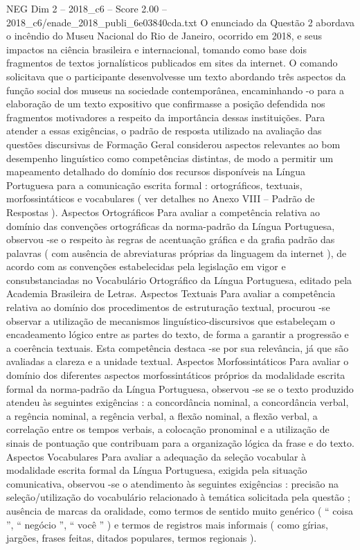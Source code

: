 \begin{textsample}{NEG Dim 2 – 2018\_c6 – Score 2.00 – 2018\_c6/enade\_2018\_publi\_6e03840cda.txt}
O enunciado da Questão 2 abordava o incêndio do Museu Nacional do Rio de Janeiro, ocorrido em 2018, e seus impactos na ciência brasileira e internacional, tomando como base dois fragmentos de textos jornalísticos publicados em sites da internet.
O comando solicitava que o participante desenvolvesse um texto abordando três aspectos da função social dos museus na sociedade contemporânea, encaminhando -o para a elaboração de um texto expositivo que confirmasse a posição defendida nos fragmentos motivadores a respeito da importância dessas instituições.
Para atender a essas exigências, o padrão de resposta utilizado na avaliação das questões discursivas de Formação Geral considerou aspectos relevantes ao bom desempenho linguístico como competências distintas, de modo a permitir um mapeamento detalhado do domínio dos recursos disponíveis na Língua Portuguesa para a comunicação escrita formal : ortográficos, textuais, morfossintáticos e vocabulares ( ver detalhes no Anexo VIII – Padrão de Respostas ).
Aspectos Ortográficos Para avaliar a competência relativa ao domínio das convenções ortográficas da norma-padrão da Língua Portuguesa, observou -se o respeito às regras de acentuação gráfica e da grafia padrão das palavras ( com ausência de abreviaturas próprias da linguagem da internet ), de acordo com as convenções estabelecidas pela legislação em vigor e consubstanciadas no Vocabulário Ortográfico da Língua Portuguesa, editado pela Academia Brasileira de Letras.
Aspectos Textuais Para avaliar a competência relativa ao domínio dos procedimentos de estruturação textual, procurou -se observar a utilização de mecanismos linguístico-discursivos que estabeleçam o encadeamento lógico entre as partes do texto, de forma a garantir a progressão e a coerência textuais.
Esta competência destaca -se por sua relevância, já que são avaliadas a clareza e a unidade textual.
Aspectos Morfossintáticos Para avaliar o domínio dos diferentes aspectos morfossintáticos próprios da modalidade escrita formal da norma-padrão da Língua Portuguesa, observou -se se o texto produzido atendeu às seguintes exigências : a concordância nominal, a concordância verbal, a regência nominal, a regência verbal, a flexão nominal, a flexão verbal, a correlação entre os tempos verbais, a colocação pronominal e a utilização de sinais de pontuação que contribuam para a organização lógica da frase e do texto.
Aspectos Vocabulares Para avaliar a adequação da seleção vocabular à modalidade escrita formal da Língua Portuguesa, exigida pela situação comunicativa, observou -se o atendimento às seguintes exigências : precisão na seleção/utilização do vocabulário relacionado à temática solicitada pela questão ; ausência de marcas da oralidade, como termos de sentido muito genérico ( “ coisa ”, “ negócio ”, “ você ” ) e termos de registros mais informais ( como gírias, jargões, frases feitas, ditados populares, termos regionais ).

\end{textsample}
